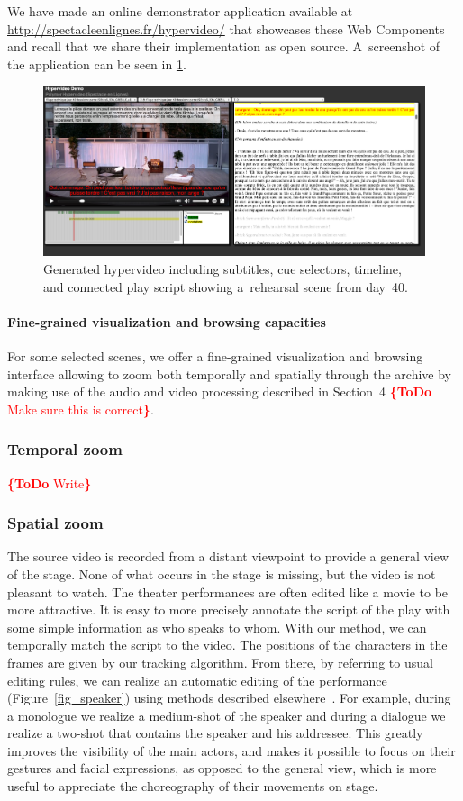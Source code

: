 \documentclass[conference]{IEEEtran}
\newcommand{\todo}[1]{\noindent\textcolor{red}{{\bf \{ToDo} #1{\bf \}}}}
\begin{document}
\noindent We have made an online demonstrator application available at
\url{http://spectacleenlignes.fr/hypervideo/} that showcases these Web Components
and recall that we share their implementation as open source.
A~screenshot of the application can be seen in \ref{fig:screenshot}.

\begin{figure}[htb!]
  \centering
  \includegraphics[width=0.95\linewidth]{screenshot}
  \caption{Generated hypervideo including subtitles, cue selectors, timeline, and connected play script
    showing a~rehearsal scene from day~40.}
  \label{fig:screenshot}
\end{figure}

\paragraph{Fine-grained visualization and browsing capacities}
For some selected scenes, we offer a fine-grained visualization and browsing interface allowing to zoom both temporally and spatially
through the archive by making use of the audio and video processing described in Section~4 \todo{Make sure this is correct}.  

\subsubsection{Temporal zoom} \todo{Write}

\subsubsection{Spatial zoom}
The source video  is recorded from a distant viewpoint  to provide  a general  view of the stage.  None of what occurs in the stage is missing, but the video is not pleasant to watch.  The theater performances are often edited like a movie to be more attractive.   It is easy to more precisely annotate the script of the play with some simple information as who speaks to whom. With our method, we can temporally match the script to the video.  The positions of the characters in the frames are given by our tracking algorithm.  From there, by referring to usual editing rules, we can realize an automatic editing of the performance (Figure~\ref{fig_speaker}) using methods described elsewhere~\cite{Gandhi14}.  For example, during a monologue we realize a medium-shot of the speaker and during a dialogue we realize a two-shot that contains the speaker and his addressee. This greatly improves the visibility of the main actors, and makes it possible to focus on their gestures and facial expressions, as opposed to the general view, which is more useful to appreciate the choreography of their movements on stage.
\end{document}
